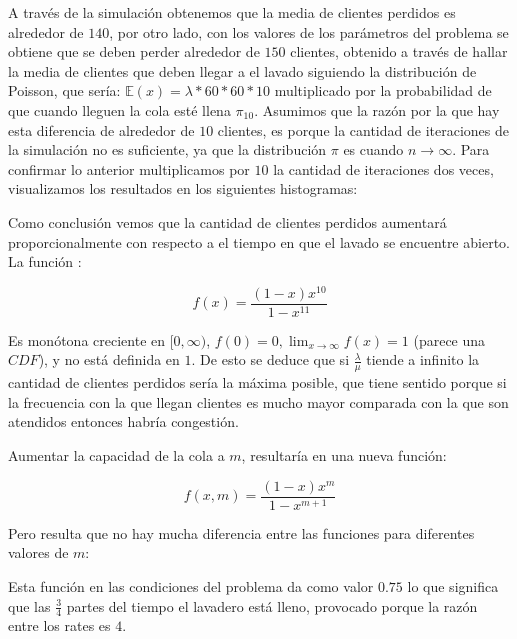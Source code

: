 \documentclass[14pt]{extarticle}
\begin{document}
    A través de la simulación obtenemos que la media de clientes perdidos es alrededor de $140$, por otro lado, con los valores de los parámetros del problema se obtiene que se deben perder alrededor de $150$ clientes, obtenido a través de hallar la media de clientes que deben llegar a el lavado siguiendo la distribución de Poisson, que sería: $\mathbb{E}(x) = \lambda * 60 * 60 * 10$ multiplicado por la probabilidad de que cuando lleguen la cola esté llena $\pi_{10}$. Asumimos que la razón por la que hay esta diferencia de alrededor de $10$ clientes, es porque la cantidad de iteraciones de la simulación no es suficiente, ya que la distribución $\pi$ es cuando $n \to \infty$. Para confirmar lo anterior multiplicamos por $10$ la cantidad de iteraciones dos veces, visualizamos los resultados en los siguientes histogramas:

    \begin{figure}[htbp]
  \centering
  

\end{figure}

Como conclusión vemos que la cantidad de clientes perdidos aumentará proporcionalmente con respecto a el tiempo en que el lavado se encuentre abierto. La función :

$$f(x) = \frac{(1-x)x^{10}}{1-x^{11}}$$

Es monótona creciente en $[0, \infty)$, $f(0) = 0, \lim_{x \to \infty} f(x) = 1$ (parece una $CDF$), y no está definida en $1$. De esto se deduce que si $\frac{\lambda}{\mu}$ tiende a infinito la cantidad de clientes perdidos sería la máxima posible, que tiene sentido porque si la frecuencia con la que llegan clientes es mucho mayor comparada con la que son atendidos entonces habría congestión.

Aumentar la capacidad de la cola a $m$, resultaría en una nueva función:

$$f(x, m) = \frac{(1-x)x^{m}}{1-x^{m+1}}$$

Pero resulta que no hay mucha diferencia entre las funciones para diferentes valores de $m$:

\begin{figure}[htbp]
    \centering
    
  \end{figure}

Esta función en las condiciones del problema da como valor $0.75$ lo que significa que las $\frac{3}{4}$ partes del tiempo el lavadero está lleno, provocado porque la razón entre los rates es $4$.
\end{document}
